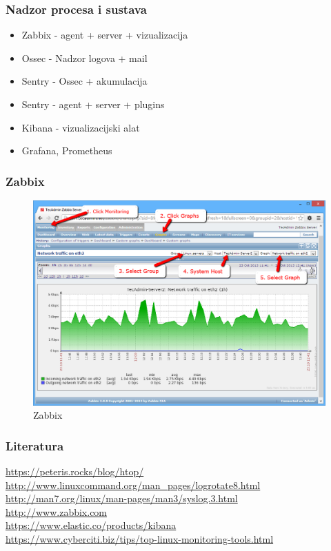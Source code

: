 \documentclass[t,table,usenames,dvipsnames]{beamer}
\begin{document}
\begin{frame}
	\frametitle{Nadzor procesa i sustava}
	
	\begin{itemize}
		\item Zabbix - agent + server + vizualizacija
        \item Ossec - Nadzor logova + mail
        \item Sentry - Ossec + akumulacija
		\item Sentry - agent + server + plugins
		\item Kibana - vizualizacijski alat
        \item Grafana, Prometheus
	\end{itemize}
	
\end{frame}

\begin{frame}
	\frametitle{Zabbix}
	\begin{figure}
		\centering
		\includegraphics[width=0.7\linewidth]{graph-network}
		\caption{Zabbix}
		\label{fig:graph-network}
	\end{figure}
	
\end{frame}


\begin{frame}
	\frametitle{Literatura}
	\url{https://peteris.rocks/blog/htop/}
	\vfill
	\url{http://www.linuxcommand.org/man_pages/logrotate8.html}\\
	\url{http://man7.org/linux/man-pages/man3/syslog.3.html}\\
	\vfill
	\url{http://www.zabbix.com}\\
	\vfill
	\url{https://www.elastic.co/products/kibana}\\
    \vfill
    \url{https://www.cyberciti.biz/tips/top-linux-monitoring-tools.html}
\end{frame}
\end{document}
